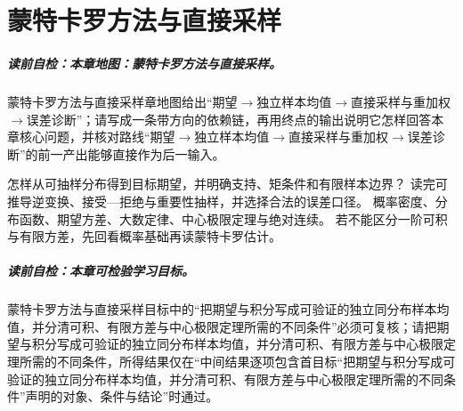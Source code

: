 \chapter{蒙特卡罗方法与直接采样}\label{chap:V5-C02}

\paragraph{读前自检：本章地图：蒙特卡罗方法与直接采样。}蒙特卡罗方法与直接采样章地图给出“期望$\to$独立样本均值$\to$直接采样与重加权$\to$误差诊断”；请写成一条带方向的依赖链，再用终点的输出说明它怎样回答本章核心问题，并核对路线“期望$\to$独立样本均值$\to$直接采样与重加权$\to$误差诊断”的前一产出能够直接作为后一输入。\par

{怎样从可抽样分布得到目标期望，并明确支持、矩条件和有限样本边界？}
{读完可推导逆变换、接受—拒绝与重要性抽样，并选择合法的误差口径。}
{概率密度、分布函数、期望方差、大数定律、中心极限定理与绝对连续。}
{若不能区分一阶可积与有限方差，先回看概率基础再读蒙特卡罗估计。}
\label{struct:V5-C02-CH01}
\paragraph{读前自检：本章可检验学习目标。}蒙特卡罗方法与直接采样目标中的“把期望与积分写成可验证的独立同分布样本均值，并分清可积、有限方差与中心极限定理所需的不同条件”必须可复核；请把期望与积分写成可验证的独立同分布样本均值，并分清可积、有限方差与中心极限定理所需的不同条件，所得结果仅在“中间结果逐项包含首目标“把期望与积分写成可验证的独立同分布样本均值，并分清可积、有限方差与中心极限定理所需的不同条件”声明的对象、条件与结论”时通过。\par


